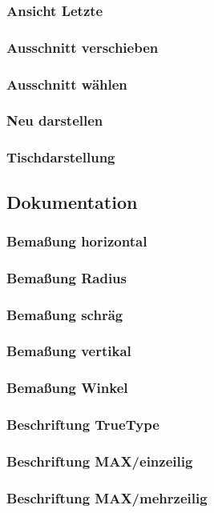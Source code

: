 \documentclass[a4paper]{book}
\begin{document}
			\subsubsection{Ansicht Letzte} 
			\subsubsection{Ausschnitt verschieben} 
			\subsubsection{Ausschnitt wählen} 
			\subsubsection{Neu darstellen} 
			\subsubsection{Tischdarstellung} 
		\subsection{Dokumentation}
			\subsubsection{Bemaßung horizontal} 
			\subsubsection{Bemaßung Radius} 
			\subsubsection{Bemaßung schräg} 
			\subsubsection{Bemaßung vertikal} 
			\subsubsection{Bemaßung Winkel} 
			\subsubsection{Beschriftung TrueType} 
			\subsubsection{Beschriftung MAX/einzeilig} 
			\subsubsection{Beschriftung MAX/mehrzeilig}
\end{document}
